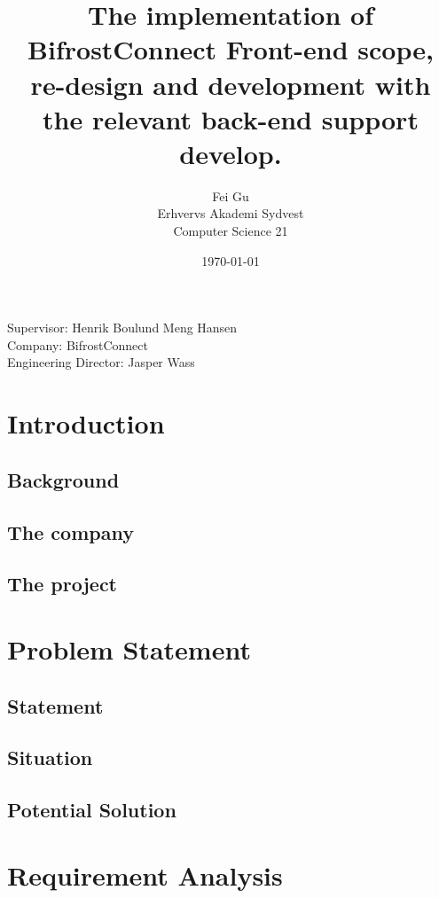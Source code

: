 \documentclass[]{article}
\title{
The implementation of BifrostConnect Front-end scope, 
re-design and development with the relevant back-end support develop.
}
\author{
    Fei Gu \\
    Erhvervs Akademi Sydvest \\
    Computer Science 21\\
    }
\date{\today}
\begin{document}
\maketitle
\begin{center}
    Supervisor: Henrik Boulund Meng Hansen \\
    Company: BifrostConnect \\
    Engineering Director: Jasper Wass \\
\end{center}
\tableofcontents
\pagebreak


\section{Introduction}
\subsection{Background}
\subsection{The company}
\subsection{The project}
\pagebreak

\section{Problem Statement}
\subsection{Statement}

\subsection{Situation}

\subsection{Potential Solution}

\pagebreak

\section{Requirement Analysis}

\end{document}
